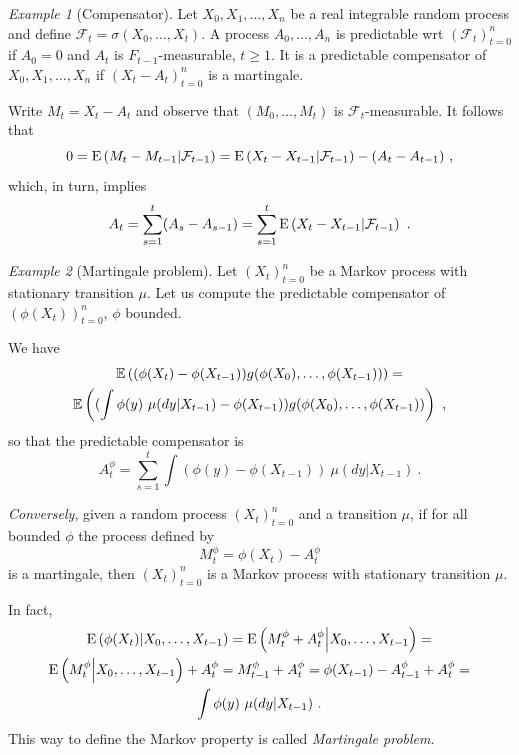 \documentclass[12pt,a4paper]{amsart}
\theoremstyle{plain}%
\theoremstyle{definition}
\theoremstyle{remark}
\newtheorem{example}{Example}
\begin{document}
\begin{example}
  [Compensator] Let $X_0,X_1,\dots,X_n$ be a real integrable random
  process and define $\mathcal F_t = \sigma(X_0,\dots,X_t)$. A process
  $A_0,\dots,A_n$ is predictable wrt $(\mathcal F_t)_{t=0}^n$ if
  $A_0=0$ and $A_t$
  is $F_{t-1}$-measurable, $t \geq 1$. It is a predictable compensator of
  $X_0,X_1,\dots,X_n$ if $(X_t - A_t)_{t=0}^n$ is a martingale.

  Write $M_t = X_t - A_t$ and observe that $(M_0,\dots,M_t)$ is
  $\mathcal F_t$-measurable. It follows that
  \begin{equation*}
0 =\operatorname{E}\left(M_t-M_{t-1} \middle| \mathcal F_{t-1}\right) = \operatorname{E}\left(X_t-X_{t-1} \middle| \mathcal F_{t-1}\right) - (A_t - A_{t-1}) \ ,
  \end{equation*}
which, in turn, implies
\begin{equation*}
  A_t = \sum_{s=1}^t (A_s - A_{s-1}) = \sum_{s=1}^t \operatorname{E}\left(X_t-X_{t-1} \middle| \mathcal F_{t-1}\right) \ .  
\end{equation*}

\end{example}
\begin{example}[Martingale problem]
Let $(X_t)_{t=0}^n$ be a Markov process with stationary transition
$\mu$. Let us compute the predictable compensator of
$(\phi(X_t))_{t=0}^n$, $\phi$ bounded.

We have
\begin{multline*}
  \operatorname{\mathbb E}\left((\phi(X_t) -
    \phi(X_{t-1}))g(\phi(X_0),\dots,\phi(X_{t-1}))\right) = \\ \operatorname{\mathbb E}\left((\int \phi(y) \ \mu(dy|X_{t-1}) -
    \phi(X_{t-1}))g(\phi(X_0),\dots,\phi(X_{t-1}))\right) \ , 
\end{multline*}
so that the predictable compensator is
\begin{equation*}
 A^\phi_t = \sum_{s=1}^t \int (\phi(y) - \phi(X_{t-1}))\
 \mu(dy|X_{t-1}) \ .
\end{equation*}

\emph{Conversely}, given a random process $(X_t)_{t=0}^n$ and a
transition $\mu$, if for all bounded $\phi$ the process defined by
\begin{equation*}
  M^\phi_t = \phi(X_t) - A^\phi_t 
\end{equation*}
is a martingale, then $(X_t)_{t=0}^n$ is a Markov process with
stationary transition $\mu$.

In fact,
\begin{multline*}
  \operatorname{E}\left(\phi(X_t) \middle| X_0,\dots,X_{t-1}\right) =  \operatorname{E}\left(M^\phi_t +
    A^\phi_t \middle| X_0,\dots,X_{t-1}\right) = \\
  \operatorname{E}\left(M^\phi_t \middle| X_0,\dots,X_{t-1}\right)  +
    A^\phi_t = M^\phi_{t-1} + A^\phi_t = \phi(X_{t-1}) - A^\phi_{t-1}
    + A^{\phi}_{t} = \\ \int \phi(y) \ \mu(dy|X_{t-1}) \ .
\end{multline*}
This way to define the Markov property is called \emph{Martingale problem}.
\end{example}

%

\end{document}
